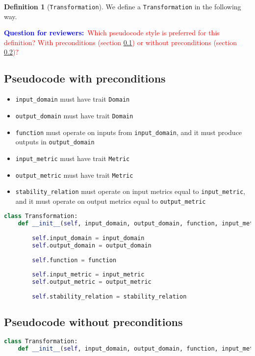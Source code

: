 \documentclass[11pt,a4paper]{article}
\theoremstyle{definition}
\newtheorem{definition}[theorem]{Definition}
\newcommand{\questionr}[1]{\textcolor{blue}{\textbf{Question for reviewers:}}\textcolor{red}{~#1}}
\begin{document}
\begin{definition}[\texttt{Transformation}]
    We define a \texttt{Transformation} in the following way.
    
    \questionr{Which pseudocode style is preferred for this definition? With preconditions (section \ref{sec:pseudocode-w-preconditions}) or without preconditions (section \ref{sec:pseudocode-wout-preconditions})?}
    
\subsection{Pseudocode with preconditions}
\label{sec:pseudocode-w-preconditions}

\begin{itemize}
    \item \texttt{input\_domain} must have trait \texttt{Domain}
    \item \texttt{output\_domain} must have trait \texttt{Domain}
    \item \texttt{function} must operate on inputs from \texttt{input\_domain}, and it must produce outputs in \texttt{output\_domain}
    \item \texttt{input\_metric} must have trait \texttt{Metric}
    \item \texttt{output\_metric} must have trait \texttt{Metric}
    \item \texttt{stability\_relation} must operate on input metrics equal to \texttt{input\_metric}, and it must operate on output metrics equal to \texttt{output\_metric}
\end{itemize}

\begin{lstlisting}[language=Python]
class Transformation:
    def __init__(self, input_domain, output_domain, function, input_metric, output_metric, stability_relation):
        
        self.input_domain = input_domain
        self.output_domain = output_domain
        
        self.function = function
        
        self.input_metric = input_metric
        self.output_metric = output_metric
        
        self.stability_relation = stability_relation
\end{lstlisting}
    
\subsection{Pseudocode without preconditions}
\label{sec:pseudocode-wout-preconditions}
\begin{lstlisting}[language=Python]
class Transformation:
    def __init__(self, input_domain, output_domain, function, input_metric, output_metric, stability_relation):
        

\end{lstlisting}
\end{definition}
\end{document}
